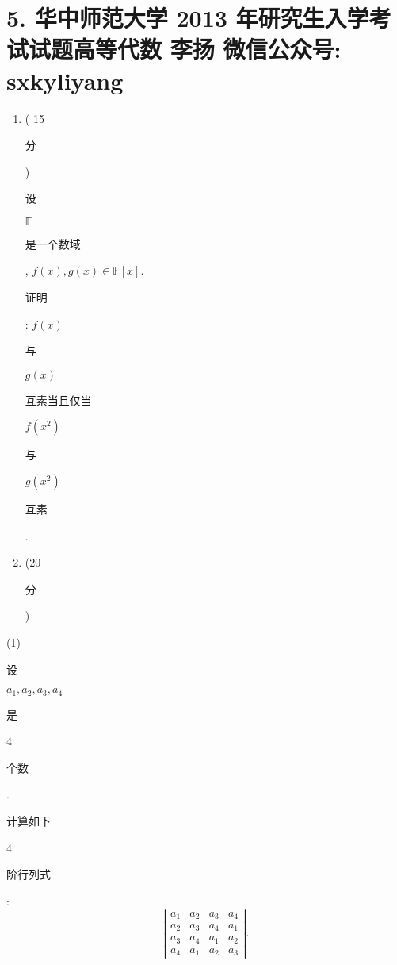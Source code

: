 \documentclass[10pt]{article}
\begin{document}
\section{5. 华中师范大学 2013 年研究生入学考试试题高等代数 
 李扬 
 微信公众号: sxkyliyang}
\begin{enumerate}
  \item ( 15 \begin{CJK}{UTF8}{mj}分\end{CJK}) \begin{CJK}{UTF8}{mj}设\end{CJK} $\mathbb{F}$ \begin{CJK}{UTF8}{mj}是一个数域\end{CJK}, $f(x), g(x) \in \mathbb{F}[x]$. \begin{CJK}{UTF8}{mj}证明\end{CJK}: $f(x)$ \begin{CJK}{UTF8}{mj}与\end{CJK} $g(x)$ \begin{CJK}{UTF8}{mj}互素当且仅当\end{CJK} $f\left(x^{2}\right)$ \begin{CJK}{UTF8}{mj}与\end{CJK} $g\left(x^{2}\right)$ \begin{CJK}{UTF8}{mj}互素\end{CJK}.

  \item (20 \begin{CJK}{UTF8}{mj}分\end{CJK})

\end{enumerate}
(1) \begin{CJK}{UTF8}{mj}设\end{CJK} $a_{1}, a_{2}, a_{3}, a_{4}$ \begin{CJK}{UTF8}{mj}是\end{CJK} 4 \begin{CJK}{UTF8}{mj}个数\end{CJK}. \begin{CJK}{UTF8}{mj}计算如下\end{CJK} 4 \begin{CJK}{UTF8}{mj}阶行列式\end{CJK}:
$$
\left|\begin{array}{llll}
a_{1} & a_{2} & a_{3} & a_{4} \\
a_{2} & a_{3} & a_{4} & a_{1} \\
a_{3} & a_{4} & a_{1} & a_{2} \\
a_{4} & a_{1} & a_{2} & a_{3}
\end{array}\right| .
$$
\end{document}
